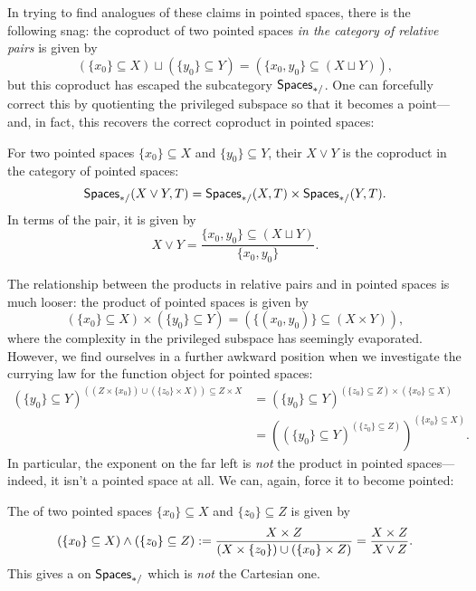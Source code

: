 In trying to find analogues of these claims in pointed spaces, there is the following snag: the coproduct of two pointed spaces \emph{in the category of relative pairs} is given by \[(\{x_0\} \subseteq X) \sqcup (\{y_0\} \subseteq Y) = (\{x_0, y_0\} \subseteq (X \sqcup Y)),\] but this coproduct has escaped the subcategory $\mathsf{Spaces}_{*/}$.
One can forcefully correct this by quotienting the privileged subspace so that it becomes a point---and, in fact, this recovers the correct coproduct in pointed spaces:

\begin{definition}
For two pointed spaces $\{x_0\} \subseteq X$ and $\{y_0\} \subseteq Y$, their  $X \vee Y$ is the coproduct in the category of pointed spaces: \[\mathsf{Spaces}_{*/}(X \vee Y, T) = \mathsf{Spaces}_{*/}(X, T) \times \mathsf{Spaces}_{*/}(Y, T).\]
In terms of the pair, it is given by \[X \vee Y = \frac{\{x_0, y_0\} \subseteq (X \sqcup Y)}{\{x_0, y_0\}}.\]
\end{definition}

The relationship between the products in relative pairs and in pointed spaces is much looser: the product of pointed spaces is given by \[(\{x_0\} \subseteq X) \times (\{y_0\} \subseteq Y) = (\{(x_0, y_0)\} \subseteq (X \times Y)),\] where the complexity in the privileged subspace has seemingly evaporated.
However, we find ourselves in a further awkward position when we investigate the currying law for the function object for pointed spaces:
\begin{align*}
(\{y_0\} \subseteq Y)^{((Z \times \{x_0\}) \cup (\{z_0\} \times X)) \subseteq Z \times X} & = (\{y_0\} \subseteq Y)^{(\{z_0\} \subseteq Z) \times (\{x_0\} \subseteq X)} \\
& = \left( (\{y_0\} \subseteq Y)^{(\{z_0\} \subseteq Z)} \right)^{(\{x_0\} \subseteq X)}.
\end{align*}
In particular, the exponent on the far left is \emph{not} the product in pointed spaces---indeed, it isn't a pointed space at all.
We can, again, force it to become pointed:

\begin{definition}
The  of two pointed spaces $\{x_0\} \subseteq X$ and $\{z_0\} \subseteq Z$ is given by \[(\{x_0\} \subseteq X) \wedge (\{z_0\} \subseteq Z) := \frac{X \times Z}{(X \times \{z_0\}) \cup (\{x_0\} \times Z)} = \frac{X \times Z}{X \vee Z}.\]
This gives a  on $\mathsf{Spaces}_{*/}$ which is \emph{not} the Cartesian one.
\end{definition}

